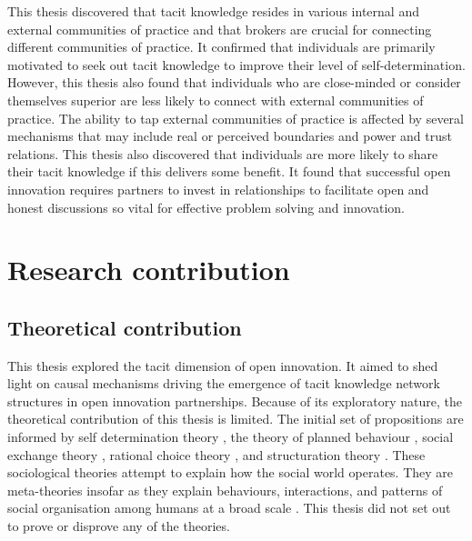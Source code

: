 This thesis discovered that tacit knowledge resides in various internal and external communities of practice and that brokers are crucial for connecting different communities of practice. It confirmed that individuals are primarily motivated to seek out tacit knowledge to improve their level of self-determination. However, this thesis also found that individuals who are close-minded or consider themselves superior are less likely to connect with external communities of practice. The ability to tap external communities of practice is affected by several mechanisms that may include real or perceived boundaries and power and trust relations. This thesis also discovered that individuals are more likely to share their tacit knowledge if this delivers some benefit. It found that successful open innovation requires partners to invest in relationships to facilitate open and honest discussions so vital for effective problem solving and innovation.

\section{Research contribution}

\subsection{Theoretical contribution}

This thesis explored the tacit dimension of open innovation. It aimed to shed light on causal mechanisms driving the emergence of tacit knowledge network structures in open innovation partnerships. Because of its exploratory nature, the theoretical contribution of this thesis is limited. The initial set of propositions are informed by self determination theory \citep{deci1985conceptualizations}, the theory of planned behaviour \citep{ajzen1985intentions}, social exchange theory \citep{homans1961social,blau1964exchange}, rational choice theory \citep{parsons1937structure,coleman1990foundations}, and structuration theory \citep{giddens1984constitution}. These sociological theories attempt to explain how the social world operates. They are meta-theories insofar as they explain behaviours, interactions, and patterns of social organisation among humans at a broad scale \citep{turner2012nature}. This thesis did not set out to prove or disprove any of the theories. \medskip

